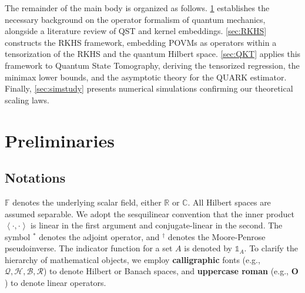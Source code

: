 \documentclass[noinfoline]{imsart}\setcounter{tocdepth}{2}
\renewcommand{\b}[1]{\mathbb{#1}} %
\newcommand{\m}[1]{\mathbf{#1}} %
\renewcommand{\c}[1]{\mathcal{#1}} %
\newcommand{\ds}[1]{\mathds{#1}} %
\newcommand{\innpr}[2]{{\left\langle {#1},{#2}\right\rangle}} %
\theoremstyle{plain}
\begin{document}
The remainder of the main body is organized as follows. \cref{sec:background} establishes the necessary background on the operator formalism of quantum mechanics, alongside a literature review of QST and kernel embeddings. \cref{sec:RKHS} constructs the RKHS framework, embedding POVMs as operators within a tensorization of the RKHS and the quantum Hilbert space. \cref{sec:QKT} applies this framework to Quantum State Tomography, deriving the tensorized regression, the minimax lower bounds, and the asymptotic theory for the QUARK estimator. Finally, \cref{sec:simstudy} presents numerical simulations confirming our theoretical scaling laws.




\section{Preliminaries}\label{sec:background}
\subsection{Notations}
$\b{F}$ denotes the underlying scalar field, either $\b{R}$ or $\b{C}$. All Hilbert spaces are assumed separable. We adopt the sesquilinear convention that the inner product $\innpr{\cdot}{\cdot}$ is linear in the first argument and conjugate-linear in the second. The symbol $^{*}$ denotes the adjoint operator, and $^{\dagger}$ denotes the Moore-Penrose pseudoinverse. The indicator function for a set $A$ is denoted by $\ds{1}_{A}$. To clarify the hierarchy of mathematical objects, we employ 
\textbf{calligraphic} fonts (e.g., $\c{Q}, \c{H}, \c{B}, \c{R}$) to denote Hilbert or Banach spaces, and \textbf{uppercase roman} (e.g., $\m{O}$) to denote linear operators. 
\end{document}
